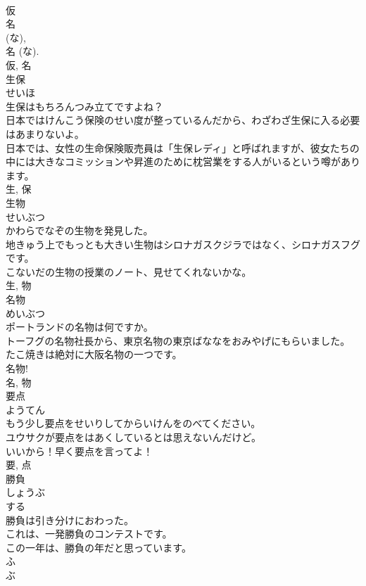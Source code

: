 \documentclass[8pt]{extreport}
\begin{document}
\begin{CJK}{UTF8}{min}
\\	仮 
\\	名 
\\	(な), 
\\	名 (な). 
\\	仮, 名	
\\	生保	
\\	せいほ	
\\	生保はもちろんつみ立てですよね？	
\\	日本ではけんこう保険のせい度が整っているんだから、わざわざ生保に入る必要はあまりないよ。	
\\	日本では、女性の生命保険販売員は「生保レディ」と呼ばれますが、彼女たちの中には大きなコミッションや昇進のために枕営業をする人がいるという噂があります。	
\\	生, 保	
\\	生物	
\\	せいぶつ	
\\	かわらでなぞの生物を発見した。	
\\	地きゅう上でもっとも大きい生物はシロナガスクジラではなく、シロナガスフグです。	
\\	こないだの生物の授業のノート、見せてくれないかな。	
\\	生, 物	
\\	名物	
\\	めいぶつ	
\\	ポートランドの名物は何ですか。	
\\	トーフグの名物社長から、東京名物の東京ばななをおみやげにもらいました。	
\\	たこ焼きは絶対に大阪名物の一つです。	
\\	名物! 
\\	名, 物	
\\	要点	
\\	ようてん	
\\	もう少し要点をせいりしてからいけんをのべてください。	
\\	ユウサクが要点をはあくしているとは思えないんだけど。	
\\	いいから！早く要点を言ってよ！	
\\	要, 点	
\\	勝負	
\\	しょうぶ	
\\	する 
\\	勝負は引き分けにおわった。	
\\	これは、一発勝負のコンテストです。	
\\	この一年は、勝負の年だと思っています。	
\\	ふ 
\\	ぶ 

\end{CJK}
\end{document}
